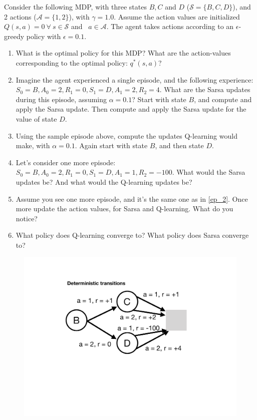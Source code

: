 Consider the following MDP, with three states $B, C$ and $D$ ($\mathcal{S} = \{B,C,D\}$), and 2 actions  ($\mathcal{A} = \{1,2\}$), with $\gamma = 1.0$.
Assume the action values are initialized $Q(s,a) = 0 ~\forall~ s\in\mathcal{S}$ and ~$a\in\mathcal{A}$. The agent takes actions according to an $\epsilon$-greedy policy with $\epsilon = 0.1$. 
\begin{enumerate}
\item What is the optimal policy for this MDP? What are the action-values corresponding to the optimal policy: $q^{*}(s,a)$?
\item Imagine the agent experienced a single episode, and the following experience: $S_0 = B, A_0 = 2, R_1 = 0, S_1 = D, A_1 = 2, R_2 = 4$. What are the Sarsa updates during this episode, assuming $\alpha = 0.1$? Start with state $B$, and compute and apply the Sarsa update. Then compute and apply the Sarsa update for the value of state $D$.
\item Using the sample episode above, compute the updates Q-learning would make, with $\alpha = 0.1$. Again start with state $B$, and then state $D$.
\item \label{ep_2} Let's consider one more episode: $S_0 = B, A_0 = 2, R_1 = 0, S_1 = D, A_1 = 1, R_2 = -100$. What would the Sarsa updates be? And what would the Q-learning updates be?
\item Assume you see one more episode, and it's the same one as in \ref{ep_2}. Once more update the action values, for Sarsa and Q-learning. What do you notice?
\item What policy does Q-learning converge to? What policy does Sarsa converge to?
\end{enumerate}
\begin{figure}[h!]
  \center
\includegraphics[width=0.5\linewidth]{figures/bcd.pdf}
\end{figure}


